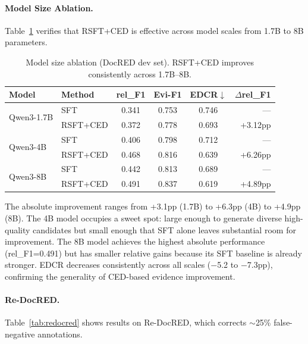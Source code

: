 \documentclass[11pt,a4paper]{article}
\newcommand{\edcr}{EDCR}
\newcommand{\rsft}{RSFT}
\begin{document}
\paragraph{Model Size Ablation.}
Table~\ref{tab:model_size} verifies that \rsft{}+CED is effective across model scales from 1.7B to 8B parameters.

\begin{table}[t]
\centering
\small
\caption{Model size ablation (DocRED dev set). \rsft{}+CED improves consistently across 1.7B--8B.}
\label{tab:model_size}
\begin{tabular}{@{}llcccr@{}}
\toprule
\textbf{Model} & \textbf{Method} & \textbf{rel\_F1} & \textbf{Evi-F1} & \textbf{\edcr{}$\downarrow$} & $\Delta$\textbf{rel\_F1} \\
\midrule
\multirow{2}{*}{Qwen3-1.7B} & SFT      & 0.341 & 0.753 & 0.746 & --- \\
                             & \rsft{}+CED & 0.372 & 0.778 & 0.693 & +3.12pp \\
\midrule
\multirow{2}{*}{Qwen3-4B}   & SFT      & 0.406 & 0.798 & 0.712 & --- \\
                             & \rsft{}+CED & 0.468 & 0.816 & 0.639 & +6.26pp \\
\midrule
\multirow{2}{*}{Qwen3-8B}   & SFT      & 0.442 & 0.813 & 0.689 & --- \\
                             & \rsft{}+CED & 0.491 & 0.837 & 0.619 & +4.89pp \\
\bottomrule
\end{tabular}
\end{table}

The absolute improvement ranges from +3.1pp (1.7B) to +6.3pp (4B) to +4.9pp (8B).
The 4B model occupies a sweet spot: large enough to generate diverse high-quality candidates but small enough that SFT alone leaves substantial room for improvement.
The 8B model achieves the highest absolute performance (rel\_F1=0.491) but has smaller relative gains because its SFT baseline is already stronger.
\edcr{} decreases consistently across all scales ($-$5.2 to $-$7.3pp), confirming the generality of CED-based evidence improvement.

\paragraph{Re-DocRED.}
Table~\ref{tab:redocred} shows results on Re-DocRED, which corrects ${\sim}$25\% false-negative annotations.
\end{document}
